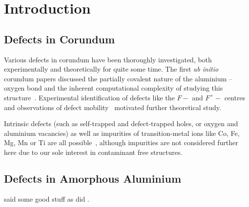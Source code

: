 \chapter{Introduction}

\section{Defects in Corundum}
Various defects in corundum have been thoroughly investigated, both experimentally and theoretically for quite some time. The first \emph{ab initio} corundum papers discussed the partially covalent nature of the aluminium -- oxygen bond and the inherent computational complexity of studying this structure~\cite{Causa1987}. Experimental identification of defects like the $F-$ and $F^+-$ centres~\cite{Kotomin1989} and observations of defect mobility~\cite{Kulis1991} motivated further theoretical study. 

Intrinsic defects (such as self-trapped and defect-trapped holes, or oxygen and aluminium vacancies) as well as impurities of transition-metal ions like Co, Fe, Mg, Mn or Ti 
are all possible~\cite{Jacobs1994}, although impurities are not considered further here due to our sole interest in contaminant free structures.

\cite{Xu1997,Heuer1999,Matsunaga2003,Carrasco2004,Perevalov2010,Pustovarov2011,Elliot2013}

\section{Defects in Amorphous Aluminium}

\citeauthor{Momida2011} said some good stuff \cite{Momida2011,Mathews2004} as did \citeauthor{Blochl1994}.  